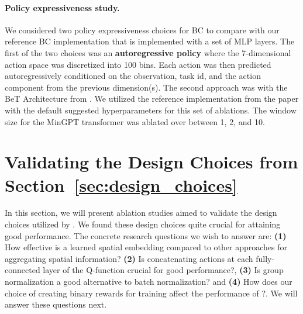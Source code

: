 \documentclass[../thesis.tex]{subfiles}
\begin{document}
\paragraph{Policy expressiveness study.}
We considered two policy expressiveness choices for BC to compare with our reference BC implementation that is implemented with a set of MLP layers. The first of the two choices was an \textbf{autoregressive policy} where the 7-dimensional action space was discretized into 100 bins. Each action was then predicted autoregressively conditioned on the observation, task id, and the action component from the previous dimension(s). The second approach was with the BeT Architecture from \citet{shafiullah2022behavior}. We utilized the reference implementation from the paper with the default suggested hyperparameters for this set of ablations. The window size for the MinGPT transformer was ablated over between 1, 2, and 10.

\section{Validating the Design Choices from Section~\ref{sec:design_choices}}
\label{app:design}

In this section, we will present ablation studies aimed to validate the design choices utilized by \ptrmethodname. We found these design choices quite crucial for attaining good performance. The concrete research questions we wish to answer are: \textbf{(1)} How effective is a learned spatial embedding compared to other approaches for aggregating spatial information? \textbf{(2)} Is concatenating actions at each fully-connected layer of the Q-function crucial for good performance?, \textbf{(3)} Is group normalization a good alternative to batch normalization? and \textbf{(4)} How does our choice of creating binary rewards for training affect the performance of \ptrmethodname?. We will answer these questions next.

\end{document}
